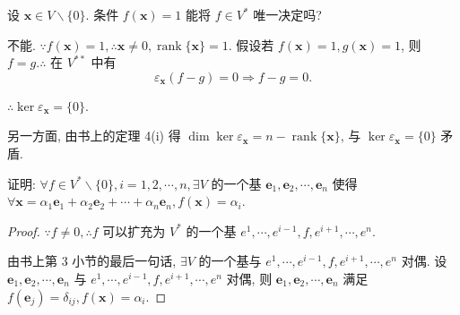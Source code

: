 \documentclass{ctexart}
\begin{document}
\begin{exercise}%
    设 $\boldsymbol{x}\in V\backslash\{0\}$. 条件 $f(\boldsymbol{x})=1$ 能将 $f\in V^*$ 唯一决定吗?
\end{exercise}
\begin{solution}
    不能. $\because f(\boldsymbol{x})=1,\therefore\boldsymbol{x}\neq0,\operatorname{rank}\{\boldsymbol{x}\}=1$. 假设若 $f(\boldsymbol{x})=1,g(\boldsymbol{x})=1$, 则 $f=g.\therefore$ 在 $V^{**}$ 中有
    \[\varepsilon_{\boldsymbol{x}}(f-g)=0\Rightarrow f-g=0.\]

    $\therefore\ker\varepsilon_{\boldsymbol{x}}=\{0\}$.
    
    另一方面, 由书上的定理 4(i) 得 $\dim\ker\varepsilon_{\boldsymbol{x}}=n-\operatorname{rank}\{\boldsymbol{x}\}$, 与 $\ker\varepsilon_{\boldsymbol{x}}=\{0\}$ 矛盾.
\end{solution}
\begin{exercise}%
    证明: $\forall f\in V^*\backslash\{0\},i=1,2,\cdots,n,\exists V$ 的一个基 $\boldsymbol{e}_1,\boldsymbol{e}_2,\cdots,\boldsymbol{e}_n$ 使得 $\forall\boldsymbol{x}=\alpha_1\boldsymbol{e}_1+\alpha_2\boldsymbol{e}_2+\cdots+\alpha_n\boldsymbol{e}_n,f(\boldsymbol{x})=\alpha_i$.
\end{exercise}
\begin{proof}
    $\because f\neq 0,\therefore f$ 可以扩充为 $V^*$ 的一个基 $e^1,\cdots,e^{i-1},f,e^{i+1},\cdots,e^n$.
    
    由书上第 3 小节的最后一句话, $\exists V$ 的一个基与 $e^1,\cdots,e^{i-1},f,e^{i+1},\cdots,e^n$ 对偶. 设 $\boldsymbol{e}_1,\boldsymbol{e}_2,\cdots,\boldsymbol{e}_n$ 与 $e^1,\cdots,e^{i-1},f,e^{i+1},\cdots,e^n$ 对偶, 则 $\boldsymbol{e}_1,\boldsymbol{e}_2,\cdots,\boldsymbol{e}_n$ 满足 $f(\boldsymbol{e}_j)=\delta_{ij},f(\boldsymbol{x})=\alpha_i$.
\end{proof}
\end{document}

